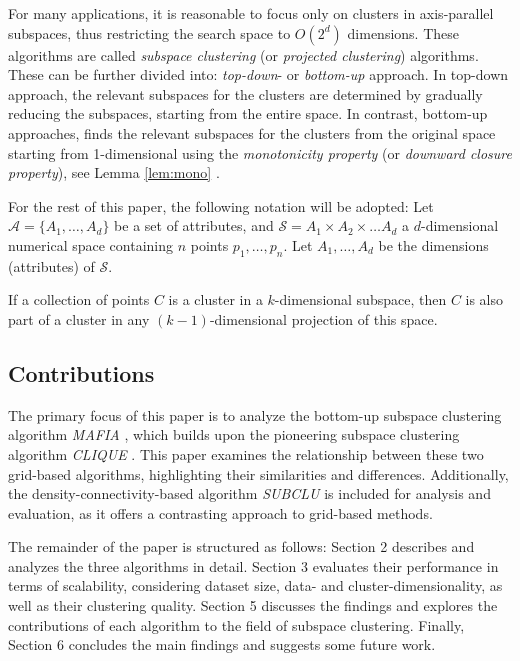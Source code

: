 For many applications, it is reasonable to focus only on clusters in axis-parallel subspaces, thus restricting the search space to $O(2^d)$ dimensions. These algorithms are called \textit{subspace clustering} (or \textit{projected clustering}) algorithms. These can be further divided into: \textit{top-down}- or \textit{bottom-up} approach. In top-down approach, the relevant subspaces for the clusters are determined by gradually reducing the subspaces, starting from the entire space. In contrast, bottom-up approaches, finds the relevant subspaces for the clusters from the original space starting from 1-dimensional using the \textit{monotonicity property} (or \textit{downward closure property}), see Lemma \ref{lem:mono} \cite{clique}. \cite[p.~8,~11]{kriegel-2009}

For the rest of this paper, the following notation will be adopted: Let $\mathcal{A} = \{A_1, \dots, A_d\}$ be a set of attributes, and $\mathcal{S} = A_1 \times A_2 \times \dots A_d$ a $d$-dimensional numerical space containing $n$ points $p_1, \dots, p_n$. Let $A_1, \dots, A_d$ be the dimensions (attributes) of $\mathcal{S}$.

\begin{lemma}\label{lem:mono}
    If a collection of points $C$ is a cluster in a $k$-dimensional subspace, then $C$ is also part of a cluster in any $(k-1)$-dimensional projection of this space.
\end{lemma}

\subsection{Contributions}
The primary focus of this paper is to analyze the bottom-up subspace clustering algorithm \textit{MAFIA} \cite{mafia}, which builds upon the pioneering subspace clustering algorithm \textit{CLIQUE} \cite{clique}. This paper examines the relationship between these two grid-based algorithms, highlighting their similarities and differences. Additionally, the density-connectivity-based algorithm \textit{SUBCLU} \cite{subclu} is included for analysis and evaluation, as it offers a contrasting approach to grid-based methods.

The remainder of the paper is structured as follows: Section 2 describes and analyzes the three algorithms in detail. Section 3 evaluates their performance in terms of scalability, considering dataset size, data- and cluster-dimensionality, as well as their clustering quality. Section 5 discusses the findings and explores the contributions of each algorithm to the field of subspace clustering. Finally, Section 6 concludes the main findings and suggests some future work.